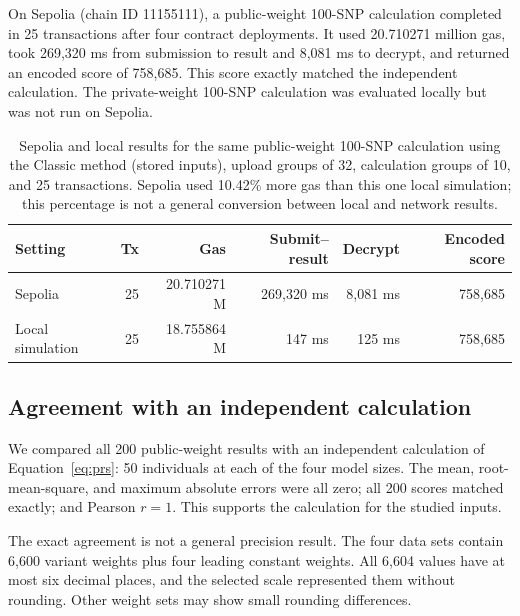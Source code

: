 \documentclass[10pt]{article}
\begin{document}
On Sepolia (chain ID 11155111), a public-weight 100-SNP calculation completed in 25
transactions after four contract deployments.  It used 20.710271 million gas, took
269,320 ms from submission to result and 8,081 ms to decrypt, and returned an encoded
score of 758,685.  This score exactly matched the independent calculation.  The
private-weight 100-SNP calculation was evaluated locally but was not run on Sepolia.

\begin{table}[t]
\centering
\caption{Sepolia and local results for the same public-weight 100-SNP calculation using the
Classic method (stored inputs), upload groups of 32, calculation groups of 10, and 25 transactions.
Sepolia used 10.42\% more gas than this one local simulation; this percentage is not a
general conversion between local and network results.}
\label{tab:live_validation}
\small
\begin{tabular}{lrrrrr}
\toprule
\textbf{Setting} & \textbf{Tx} & \textbf{Gas} & \textbf{Submit--result} & \textbf{Decrypt} & \textbf{Encoded score} \\
\midrule
Sepolia & 25 & 20.710271 M & 269,320 ms & 8,081 ms & 758,685 \\
Local simulation & 25 & 18.755864 M & 147 ms & 125 ms & 758,685 \\
\bottomrule
\end{tabular}
\end{table}

\subsection{Agreement with an independent calculation}

We compared all 200 public-weight results with an independent calculation of
Equation~\ref{eq:prs}: 50 individuals at each of the
four model sizes.  The mean,
root-mean-square, and maximum absolute errors were all zero; all 200 scores matched
exactly; and Pearson $r=1$.  This supports the calculation for the studied inputs.

The exact agreement is not a general precision result.  The four data sets contain
6,600 variant weights plus four leading constant weights.  All 6,604 values have at
most six decimal places, and the selected scale represented them without rounding.
Other weight sets may show small rounding differences.
\end{document}
